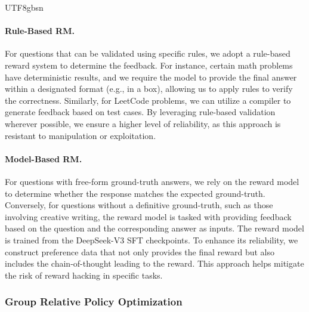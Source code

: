 \documentclass[11pt, a4paper, logo, copyright, nonumbering]{deepseek}
\newcommand{\dsviii}{DeepSeek-V3}
\begin{document}
\begin{CJK*}{UTF8}{gbsn}
\paragraph{Rule-Based RM.} 
For questions that can be validated using specific rules, we adopt a rule-based reward system to determine the feedback. 
For instance, certain math problems have deterministic results, and we require the model to provide the final answer within a designated format (e.g., in a box), allowing us to apply rules to verify the correctness. 
Similarly, for LeetCode problems, we can utilize a compiler to generate feedback based on test cases. 
By leveraging rule-based validation wherever possible, we ensure a higher level of reliability, as this approach is resistant to manipulation or exploitation.

\paragraph{Model-Based RM.} 
For questions with free-form ground-truth answers, we rely on the reward model to determine whether the response matches the expected ground-truth. 
Conversely, for questions without a definitive ground-truth, such as those involving creative writing, the reward model is tasked with providing feedback based on the question and the corresponding answer as inputs. 
The reward model is trained from the \dsviii{} SFT checkpoints. 
To enhance its reliability, we construct preference data that not only provides the final reward but also includes the chain-of-thought leading to the reward. 
This approach helps mitigate the risk of reward hacking in specific tasks.

\subsubsection{Group Relative Policy Optimization}


\end{CJK*}
\end{document}
